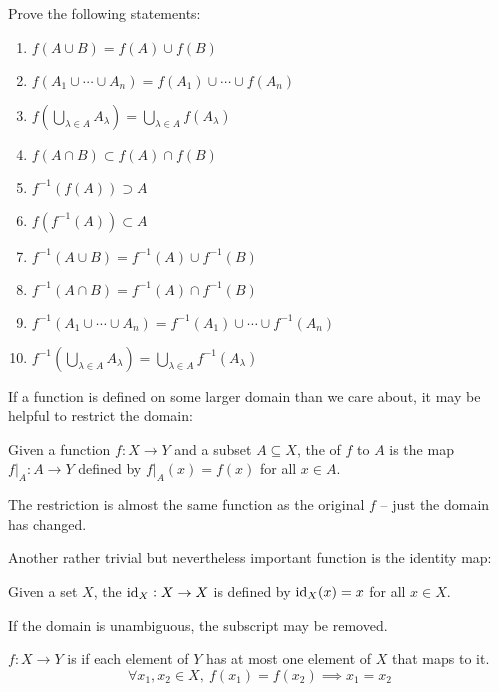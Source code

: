 \begin{exercise}
Prove the following statements:
\begin{enumerate}[label=(\alph*)]
\item $f(A\cup B)=f(A)\cup f(B)$
\item $f(A_1\cup\cdots\cup A_n)=f(A_1)\cup\cdots\cup f(A_n)$
\item $f(\bigcup_{\lambda\in A}A_\lambda)=\bigcup_{\lambda\in A}f(A_\lambda)$
\item $f(A\cap B)\subset f(A)\cap f(B)$
\item $f^{-1}(f(A))\supset A$
\item $f(f^{-1}(A))\subset A$
\item $f^{-1}(A\cup B)=f^{-1}(A)\cup f^{-1}(B)$
\item $f^{-1}(A\cap B)=f^{-1}(A)\cap f^{-1}(B)$
\item $f^{-1}(A_1\cup\cdots\cup A_n)=f^{-1}(A_1)\cup\cdots\cup f^{-1}(A_n)$
\item $f^{-1}(\bigcup_{\lambda\in A}A_\lambda)=\bigcup_{\lambda\in A}f^{-1}(A_\lambda)$
\end{enumerate}
\end{exercise}

If a function is defined on some larger domain than we care about, it may be helpful to restrict the domain:

\begin{definition}[Restriction]
Given a function $f:X \to Y$ and a subset $A \subseteq X$, the  of $f$ to $A$ is the map $f|_A:A \to Y$ defined by $f|_A(x) = f(x)$ for all $x \in A$.
\end{definition}

The restriction is almost the same function as the original $f$ -- just the domain has changed.

Another rather trivial but nevertheless important function is the identity map:

\begin{definition}
Given a set $X$, the  $\operatorname{id}_X:X \to X$ is defined by $\operatorname{id}_X(x) = x$ for all $x \in X$.
\end{definition}

\begin{notation}
If the domain is unambiguous, the subscript may be removed.
\end{notation}

\begin{definition}[Injectivity]
$f:X\to Y$ is  if each element of $Y$ has at most one element of $X$ that maps to it.
\[\forall x_1,x_2\in X,\:f(x_1)=f(x_2) \implies x_1=x_2\]
\end{definition}

